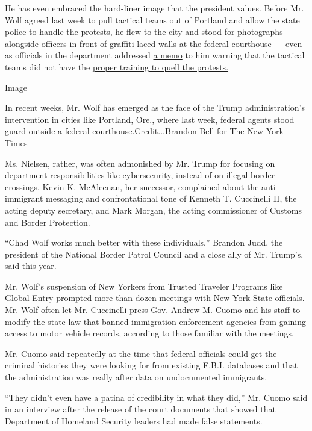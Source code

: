 He has even embraced the hard-liner image that the president values.
Before Mr. Wolf agreed last week to pull tactical teams out of Portland
and allow the state police to handle the protests, he flew to the city
and stood for photographs alongside officers in front of graffiti-laced
walls at the federal courthouse --- even as officials in the department
addressed
\href{https://int.graylady3jvrrxbe.onion/data/documenttools/dh-stacticalagent-memo1/d490e392eab7d7d6/full.pdf}{a
memo} to him warning that the tactical teams did not have the
\href{https://www.nytimes3xbfgragh.onion/2020/07/18/us/portland-protests.html}{proper
training to quell the protests.}

Image

In recent weeks, Mr. Wolf has emerged as the face of the Trump
administration's intervention in cities like Portland, Ore., where last
week, federal agents stood guard outside a federal
courthouse.Credit...Brandon Bell for The New York Times

Ms. Nielsen, rather, was often admonished by Mr. Trump for focusing on
department responsibilities like cybersecurity, instead of on illegal
border crossings. Kevin K. McAleenan, her successor, complained about
the anti-immigrant messaging and confrontational tone of Kenneth T.
Cuccinelli II, the acting deputy secretary, and Mark Morgan, the acting
commissioner of Customs and Border Protection.

``Chad Wolf works much better with these individuals,'' Brandon Judd,
the president of the National Border Patrol Council and a close ally of
Mr. Trump's, said this year.

Mr. Wolf's suspension of New Yorkers from Trusted Traveler Programs like
Global Entry prompted more than dozen meetings with New York State
officials. Mr. Wolf often let Mr. Cuccinelli press Gov. Andrew M. Cuomo
and his staff to modify the state law that banned immigration
enforcement agencies from gaining access to motor vehicle records,
according to those familiar with the meetings.

Mr. Cuomo said repeatedly at the time that federal officials could get
the criminal histories they were looking for from existing F.B.I.
databases and that the administration was really after data on
undocumented immigrants.

``They didn't even have a patina of credibility in what they did,'' Mr.
Cuomo said in an interview after the release of the court documents that
showed that Department of Homeland Security leaders had made false
statements.

